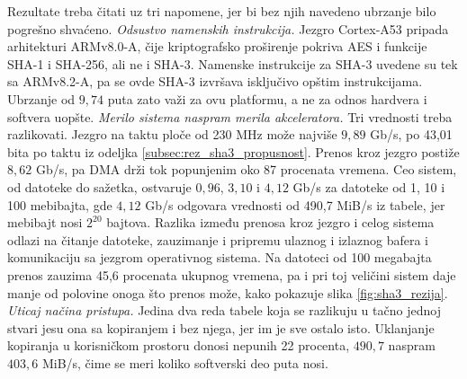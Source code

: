 \begin{table}[H]
\caption{Propusnost pri heširanju datoteke od 100 MiB, varijanta SHA3-512}
\centering
{}
\label{tab:sha3_ploca}
\end{table}

Rezultate treba čitati uz tri napomene, jer bi bez njih navedeno ubrzanje bilo pogrešno shvaćeno.
\smallbreak
\textit{Odsustvo namenskih instrukcija.} Jezgro Cortex-A53 pripada arhitekturi ARMv8.0-A, čije kriptografsko proširenje pokriva AES i funkcije SHA-1 i SHA-256, ali ne i SHA-3. Namenske instrukcije za SHA-3 uvedene su tek sa ARMv8.2-A, pa se ovde SHA-3 izvršava isključivo opštim instrukcijama. Ubrzanje od $9{,}74$ puta zato važi za ovu platformu, a ne za odnos hardvera i softvera uopšte.
\smallbreak
\textit{Merilo sistema naspram merila akceleratora.} Tri vrednosti treba razlikovati. Jezgro na taktu ploče od 230 MHz može najviše $9{,}89$ Gb/s, po 43,01 bita po taktu iz odeljka \ref{subsec:rez_sha3_propusnost}. Prenos kroz jezgro postiže $8{,}62$ Gb/s, pa DMA drži tok popunjenim oko 87 procenata vremena. Ceo sistem, od datoteke do sažetka, ostvaruje $0{,}96$, $3{,}10$ i $4{,}12$ Gb/s za datoteke od 1, 10 i 100 mebibajta, gde $4{,}12$ Gb/s odgovara vrednosti od 490,7 MiB/s iz tabele, jer mebibajt nosi $2^{20}$ bajtova. Razlika između prenosa kroz jezgro i celog sistema odlazi na čitanje datoteke, zauzimanje i pripremu ulaznog i izlaznog bafera i komunikaciju sa jezgrom operativnog sistema. Na datoteci od 100 megabajta prenos zauzima 45,6 procenata ukupnog vremena, pa i pri toj veličini sistem daje manje od polovine onoga što prenos može, kako pokazuje slika \ref{fig:sha3_rezija}.
\smallbreak
\textit{Uticaj načina pristupa.} Jedina dva reda tabele koja se razlikuju u tačno jednoj stvari jesu ona sa kopiranjem i bez njega, jer im je sve ostalo isto. Uklanjanje kopiranja u korisničkom prostoru donosi nepunih 22 procenta, $490{,}7$ naspram $403{,}6$ MiB/s, čime se meri koliko softverski deo puta nosi.

